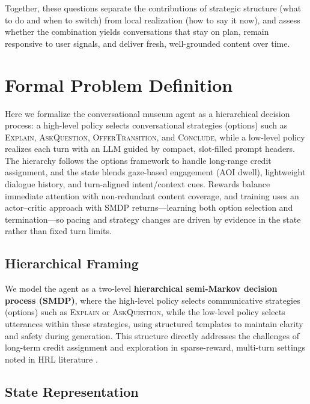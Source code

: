 \documentclass[12pt]{article}
\begin{document}
\medskip
Together, these questions separate the contributions of strategic structure (what to do and when to switch) from local realization (how to say it now), and assess whether the combination yields conversations that stay on plan, remain responsive to user signals, and deliver fresh, well-grounded content over time.


\section{Formal Problem Definition}
\label{sec:problem-definition}

Here we formalize the conversational museum agent as a hierarchical decision process: a high-level policy selects conversational strategies (options) such as \textsc{Explain}, \textsc{AskQuestion}, \textsc{OfferTransition}, and \textsc{Conclude}, while a low-level policy realizes each turn with an LLM guided by compact, slot-filled prompt headers. The hierarchy follows the options framework \citep{sutton1999between} to handle long-range credit assignment, and the state blends gaze-based engagement (AOI dwell), lightweight dialogue history, and turn-aligned intent/context cues. Rewards balance immediate attention with non-redundant content coverage, and training uses an actor–critic approach with SMDP returns—learning both option selection and termination—so pacing and strategy changes are driven by evidence in the state rather than fixed turn limits.

\subsection{Hierarchical Framing}

We model the agent as a two-level \textbf{hierarchical semi-Markov decision process (SMDP)}, where the high-level policy selects communicative strategies (options) such as \textsc{Explain} or \textsc{AskQuestion}, while the low-level policy selects utterances within these strategies, using structured templates to maintain clarity and safety during generation. This structure directly addresses the challenges of long-term credit assignment and exploration in sparse-reward, multi-turn settings noted in HRL literature \citep{bacon2017option, peng2017composite}.

\subsection{State Representation}
\label{sec:state-representation}
\end{document}
